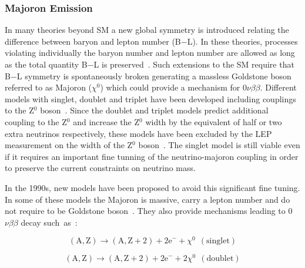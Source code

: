 \documentclass[main.tex]{subfiles}
\begin{document}
\FloatBarrier


\subsubsection{Majoron Emission}


\NI In many theories beyond SM a new global symmetry is introduced relating the difference between baryon and lepton number (B$-$L). In these theories, processes violating individually the baryon number and lepton number are allowed as long as the total quantity B$-$L is preserved~\cite{B-L-Interaction}. Such extensions to the SM require that B$-$L symmetry is spontaneously broken generating a massless Goldstone boson referred to as Majoron ($\chi^\text{0}$) which could provide a mechanism for 0$\nu\beta\beta$. Different models with singlet, doublet and triplet have been developed including couplings to the Z$^\text{0}$ boson~\cite{MajoronEmission1,MajoronEmission2,MajoronEmission3}. Since the doublet and triplet models predict additional coupling to the Z$^\text{0}$ and increase the Z$^\text{0}$ width by the equivalent of half or two extra neutrinos respectively, these models have been excluded by the LEP measurement on the width of the Z$^\text{0}$ boson~\cite{ALEPH3neutrino}. The singlet model is still viable even if it requires an important fine tunning of the neutrino-majoron coupling in order to preserve the current constraints on neutrino mass.


\bigskip


\NI In the 1990s, new models have been proposed to avoid this significant fine tuning. In some of these models the Majoron is massive, carry a lepton number and do not require to be Goldstone boson~\cite{MajoronDecayMode}. They also provide mechanisms leading to 0$\nu\beta\beta$ decay such~as~:


\begin{equation}
(\text{A},\text{Z}) \rightarrow (\text{A},\text{Z}+\text{2}) + \text{2e}^- + \chi^{\text{0}}~~(\text{singlet})
\end{equation}

\begin{equation}
(\text{A},\text{Z}) \rightarrow (\text{A},\text{Z}+\text{2}) + \text{2e}^- + \text{2}\chi^{\text{0}}~~(\text{doublet})
\end{equation}


\bigskip




\end{document}
